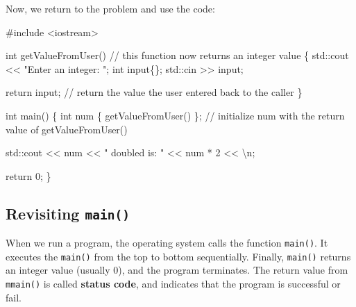 \documentclass[
  letterpaper,
  DIV=11,
  numbers=noendperiod]{scrreprt}
\newenvironment{Shaded}{\begin{snugshade}}{\end{snugshade}}
\newcommand{\CommentTok}[1]{\textcolor[rgb]{0.37,0.37,0.37}{#1}}
\newcommand{\ControlFlowTok}[1]{\textcolor[rgb]{0.00,0.23,0.31}{#1}}
\newcommand{\DecValTok}[1]{\textcolor[rgb]{0.68,0.00,0.00}{#1}}
\newcommand{\ErrorTok}[1]{\textcolor[rgb]{0.68,0.00,0.00}{#1}}
\newcommand{\FunctionTok}[1]{\textcolor[rgb]{0.28,0.35,0.67}{#1}}
\newcommand{\NormalTok}[1]{\textcolor[rgb]{0.00,0.23,0.31}{#1}}
\newcommand{\SpecialCharTok}[1]{\textcolor[rgb]{0.37,0.37,0.37}{#1}}
\newcommand{\StringTok}[1]{\textcolor[rgb]{0.13,0.47,0.30}{#1}}
\begin{document}
Now, we return to the problem and use the code:

\begin{Shaded}
\begin{Highlighting}[]
\CommentTok{\#include \textless{}iostream\textgreater{}}

\NormalTok{int }\FunctionTok{getValueFromUser}\NormalTok{() }\SpecialCharTok{/}\ErrorTok{/}\NormalTok{ this }\ControlFlowTok{function}\NormalTok{ now returns an integer value}
\NormalTok{\{}
\NormalTok{    std}\SpecialCharTok{::}\NormalTok{cout }\SpecialCharTok{\textless{}}\ErrorTok{\textless{}} \StringTok{"Enter an integer: "}\NormalTok{;}
\NormalTok{    int input\{\};}
\NormalTok{    std}\SpecialCharTok{::}\NormalTok{cin }\SpecialCharTok{\textgreater{}}\ErrorTok{\textgreater{}}\NormalTok{ input;}

\NormalTok{    return input; }\SpecialCharTok{/}\ErrorTok{/}\NormalTok{ return the value the user entered back to the caller}
\NormalTok{\}}

\NormalTok{int }\FunctionTok{main}\NormalTok{()}
\NormalTok{\{}
\NormalTok{    int num \{ }\FunctionTok{getValueFromUser}\NormalTok{() \}; }\SpecialCharTok{/}\ErrorTok{/}\NormalTok{ initialize num with the return value of }\FunctionTok{getValueFromUser}\NormalTok{()}

\NormalTok{    std}\SpecialCharTok{::}\NormalTok{cout }\SpecialCharTok{\textless{}}\ErrorTok{\textless{}}\NormalTok{ num }\SpecialCharTok{\textless{}}\ErrorTok{\textless{}} \StringTok{" doubled is: "} \SpecialCharTok{\textless{}}\ErrorTok{\textless{}}\NormalTok{ num }\SpecialCharTok{*} \DecValTok{2} \SpecialCharTok{\textless{}}\ErrorTok{\textless{}} \StringTok{\textquotesingle{}}\SpecialCharTok{\textbackslash{}n}\StringTok{\textquotesingle{}}\NormalTok{;}

\NormalTok{    return }\DecValTok{0}\NormalTok{;}
\NormalTok{\}}
\end{Highlighting}
\end{Shaded}

\hypertarget{revisiting-main}{%
\subsection{\texorpdfstring{Revisiting
\texttt{main()}}{Revisiting main()}}\label{revisiting-main}}

When we run a program, the operating system calls the function
\texttt{main()}. It executes the \texttt{main()} from the top to bottom
sequentially. Finally, \texttt{main()} returns an integer value (usually
0), and the program terminates. The return value from \texttt{mmain()}
is called \textbf{status code}, and indicates that the program is
successful or fail.
\end{document}

